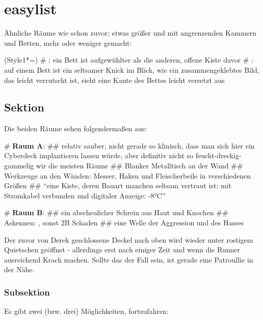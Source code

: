 \chapter{easylist}

Ähnliche Räume wie schon zuvor: etwas größer und mit angrenzenden Kammern und Betten, mehr oder weniger gemacht:

\begin{easylist}
\ListProperties(Style1*=\textendash\hspace{2mm})
    # : ein Bett ist aufgewühlter als die anderen, offene Kiste davor
    # : auf einem Bett ist ein seltsamer Knick im Blick, wie ein zusammengeklebtes Bild, das leicht verrutscht ist, sieht eine Kante des Bettes leicht versetzt aus
\end{easylist}

\section{Sektion}

Die beiden Räume sehen folgendermaßen aus:

\begin{easylist}
    # \textbf{Raum A}:
        ## relativ sauber; nicht gerade so klinisch, dass man sich hier ein Cyberdeck implantieren lassen würde, aber definitiv nicht so feucht-dreckig-gammelig wir die meisten Räume
        ## Blanker Metalltisch an der Wand
        ## Werkzeuge an den Wänden: Messer, Haken und Fleischerbeile in verschiedenen Größen
        ## ``eine Kiste, deren Bauart manchen seltsam vertraut ist: mit Stromkabel verbunden und digitaler Anzeige: -8°C''

    # \textbf{Raum B}:
        ## ein abscheulicher Schrein aus Haut und Knochen
        ## Askennen: , sonst 2B Schaden
        ## eine Welle der Aggression und des Hasses 
\end{easylist}

Der zuvor von Derek geschlossene Deckel nach oben wird wieder unter rostigem Quietschen geöffnet - allerdings erst nach einiger Zeit und wenn die Runner ausreichend Krach machen. Sollte das der Fall sein, ist gerade eine Patroullie in der Nähe.

\subsection{Subsektion}

Es gibt zwei (bzw. drei) Möglichkeiten, fortzufahren:

